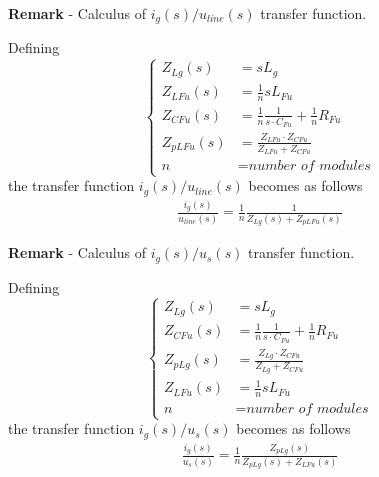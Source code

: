 \documentclass[12pt,a4paper]{scrartcl}
\begin{document}
\begin{onehalfspace}
\noindent\textbf{Remark} - Calculus of ${i_g(s)}/{u_{line}(s)}$ transfer function.

Defining
\begin{equation}\left\lbrace 
	\begin{aligned}
		Z_{Lg}(s) &= sL_g \\
		Z_{LFu}(s) &= \frac{1}{n}sL_{Fu} \\		
		Z_{CFu}(s) &= \frac{1}{n}\frac{1}{s\cdot C_{Fu}} + \frac{1}{n}R_{Fu} \\
		Z_{pLFu}(s) &= \frac{Z_{LFu}\cdot Z_{CFu}}{Z_{LFu} + Z_{CFu}} \\
		n &= \textit{number of modules} 
	\end{aligned}\right. 
\end{equation}
the transfer function ${i_g(s)}/{u_{line}(s)}$ becomes as follows
\begin{equation}
	\begin{aligned}
		\frac{i_g(s)}{u_{line}(s)} = \frac{1}{n} \frac{1}{Z_{Lg}(s)+Z_{pLFu}(s)}
	\end{aligned}
\end{equation}


\noindent\textbf{Remark} - Calculus of ${i_g(s)}/{u_s(s)}$ transfer function.

Defining
\begin{equation}\left\lbrace 
	\begin{aligned}
		Z_{Lg}(s) &= sL_g \\
		Z_{CFu}(s) &= \frac{1}{n}\frac{1}{s\cdot C_{Fu}} + \frac{1}{n}R_{Fu} \\
		Z_{pLg}(s) &= \frac{Z_{Lg}\cdot Z_{CFu}}{Z_{Lg} + Z_{CFu}} \\
		Z_{LFu}(s) &= \frac{1}{n}sL_{Fu} \\		
		n &= \textit{number of modules} 
	\end{aligned}\right. 
\end{equation}
the transfer function ${i_g(s)}/{u_s(s)}$ becomes as follows
\begin{equation}
	\begin{aligned}
		\frac{i_g(s)}{u_s(s)} = \frac{1}{n} \frac{Z_{pLg}(s)}{Z_{pLg}(s)+Z_{LFu}(s)}
	\end{aligned}
\end{equation}


\end{onehalfspace}
\end{document}
